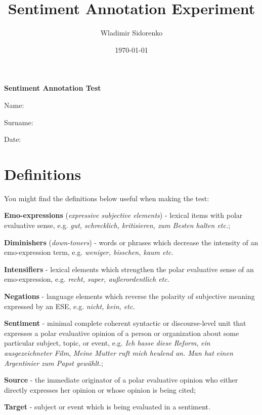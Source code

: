 \documentclass[12pt,fleqn]{scrreprt}
\author{Wladimir Sidorenko}
\date{\today}
\title{Sentiment Annotation Experiment}
\begin{document}
\begin{center}
{\LARGE{\bfseries Sentiment Annotation Test}}
\end{center}

\begin{flushright}
Name: \underline{\hspace{6cm}}

Surname: \underline{\hspace{6cm}}

Date: \underline{\hspace{6cm}}
\end{flushright}

\section*{Definitions}
You might find the definitions below useful when making the test:

\textbf{Emo-expressions} (\textit{expressive subjective elements}) -
lexical items with polar evaluative sense, e.g. \textit{gut,
  schrecklich, kritisieren, zum Besten halten etc.};

\textbf{Diminishers} (\textit{down-toners}) - words or phrases which
decrease the intensity of an emo-expression term,
e.g. \textit{weniger, bisschen, kaum etc.}

\textbf{Intensifiers} - lexical elements which strengthen the polar
evaluative sense of an emo-expression, e.g. \textit{recht, super,
  au\ss{}erordentlich etc.}

\textbf{Negations} - language elements which reverse the polarity of
subjective meaning expressed by an ESE, e.g. \textit{nicht, kein,
  etc.}

\textbf{Sentiment} - minimal complete coherent syntactic or
discourse-level unit that expresses a polar evaluative opinion of a
person or organization about some particular subject, topic, or event,
e.g. \textit{Ich hasse diese Reform}, \textit{ein ausgezeichneter
  Film}, \textit{Meine Mutter ruft mich heulend an.  Man hat einen
  Argentinier zum Papst gew\"ahlt.};

\textbf{Source} - the immediate originator of a polar evaluative
opinion who either directly expresses her opinion or whose opinion is
being cited;

\textbf{Target} - subject or event which is being evaluated in a
sentiment.
\end{document}

